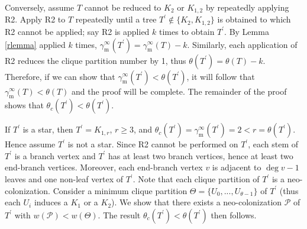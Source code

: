 \documentclass[12pt]{article}%
\begin{document}
Conversely, assume $T$ cannot be reduced to $K_{2}$ or $K_{1,2}$ by repeatedly
applying R2. Apply R2 to $T$ repeatedly until a tree $T^{\prime}\notin%
\{K_{2},K_{1,2}\}$ is obtained to which R2 cannot be applied; say R2 is
applied $k$ times to obtain $T^{\prime}$. By Lemma \ref{rlemma} applied $k$
times, $\gamma_{\mathrm{m}}^{\infty}(T^{\prime})=\gamma_{\mathrm{m}}^{\infty
}(T)-k$. Similarly, each application of R2 reduces the clique partition number
by 1, thus $\theta(T^{\prime})=\theta(T)-k$. Therefore, if we can show that
$\gamma_{\mathrm{m}}^{\infty}(T^{\prime})<\theta(T^{\prime})$, it will follow
that $\gamma_{\mathrm{m}}^{\infty}(T)<\theta(T)$ and the proof will be
complete. The remainder of the proof shows that $\theta_{c}(T^{\prime}%
)<\theta(T^{\prime})$.

If $T^{\prime}$ is a star, then $T^{\prime}=K_{1,r}$, $r\geq3$, and
$\theta_{c}(T^{\prime})=\gamma_{\mathrm{m}}^{\infty}(T^{\prime})=2<r=\theta
(T^{\prime})$. Hence assume $T^{\prime}$ is not a star. Since R2 cannot be
performed on $T^{\prime}$, each stem of $T^{\prime}$ is a branch vertex and
$T^{\prime}$ has at least two branch vertices, hence at least two end-branch
vertices. Moreover, each end-branch vertex $v$ is adjacent to $\deg v-1$
leaves and one non-leaf vertex of $T^{\prime}$. Note that each clique
partition of $T^{\prime}$ is a neo-colonization. Consider a minimum clique
partition $\Theta=\{U_{0},...,U_{\theta-1}\}$ of $T^{\prime}$ (thus each
$U_{i}$ induces a $K_{1}$ or a $K_{2}$). We show that there exists a
neo-colonization $\mathcal{P}$ of $T^{\prime}$ with $w(\mathcal{P})<w(\Theta
)$. The result $\theta_{c}(T^{\prime})<\theta(T^{\prime})$ then follows.
\end{document}
